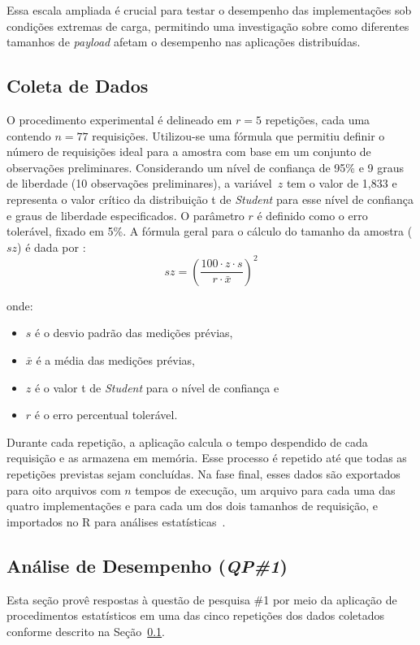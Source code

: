 Essa escala ampliada é crucial para testar o desempenho das implementações sob condições extremas de carga, permitindo uma investigação %
sobre como diferentes tamanhos de \textit{payload} afetam o desempenho nas aplicações distribuídas.

\subsection{Coleta de Dados}
\label{sec:coletadados}

O procedimento experimental é delineado em $r=5$ repetições, cada uma contendo $n = 77$ requisições. 
%
Utilizou-se uma fórmula que permitiu definir o número de requisições ideal para a amostra com base em um conjunto de observações preliminares.
Considerando um nível de confiança de 95\% e 9 graus de liberdade (10 observações preliminares), a variável~\(z\) tem o valor de 1,833 e representa o valor crítico da distribuição t de \textit{Student} para esse nível de confiança e graus de liberdade especificados. O parâmetro \(r\) é definido como o erro tolerável, fixado em 5\%. A fórmula geral para o cálculo do tamanho da amostra (\(sz\)) 
é dada por \cite{jain1991}:
\begin{equation}
sz = \left( \frac{100 \cdot z \cdot s}{r \cdot \bar{x}} \right)^2
\end{equation}

onde:
\begin{itemize}
    \item \(s\) é o desvio padrão das medições prévias,
    \item \(\bar{x}\) é a média das medições prévias,
    \item \(z\) é o valor t de \textit{Student} para o nível de confiança e
    \item \(r\) é o erro percentual tolerável.
\end{itemize}

Durante cada repetição, a aplicação calcula o tempo despendido de cada requisição e as armazena em memória.
Esse processo é repetido até que todas as repetições previstas sejam concluídas.
Na fase final, 
esses dados são exportados para 
oito arquivos com $n$ tempos de execução,
um arquivo para cada uma das quatro implementações e
para cada um dos dois tamanhos de requisição,
e importados no R para análises estatísticas~\cite{R}.

\subsection{Análise de Desempenho ({\em QP\#1})}
Esta seção provê respostas à questão de pesquisa \#1 por meio da aplicação de procedimentos estatísticos em uma das cinco repetições dos dados coletados conforme descrito na Seção~\ref{sec:coletadados}. 


